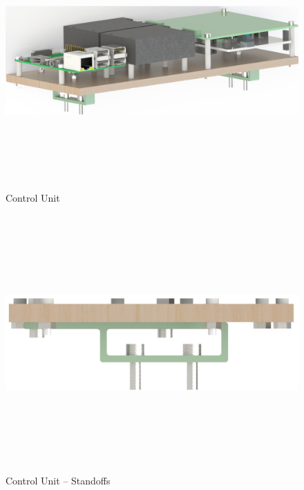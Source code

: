 \begin{figure}[H]   %
	\centering \includegraphics[width=6in, height=3.85in, keepaspectratio]{figures/control_unit.png}
	\caption{Control Unit}	\label{fig:control_unit}
\end{figure}

\begin{figure}[H]   %
	\centering \includegraphics[width=6in, height=3.85in, keepaspectratio]{figures/control_unit_standoffs.png}
	\caption{Control Unit -- Standoffs}	\label{fig:control_unit_standoffs}
\end{figure}
